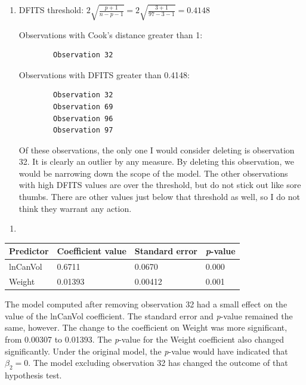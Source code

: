 \documentclass{article}
\providecommand{\tightlist}{%
      \setlength{\itemsep}{0pt}\setlength{\parskip}{0pt}}
\begin{document}
\begin{enumerate}
\def\labelenumi{\alph{enumi})}
\setcounter{enumi}{3}
\tightlist
\item
  DFITS threshold:
  \(2 \sqrt{\frac{p + 1}{n - p -1}} = 2 \sqrt{\frac{3 + 1}{97 - 3 - 1}} = 0.4148\)

Observations with Cook's distance greater than 1:

\begin{verbatim}
        Observation 32
\end{verbatim}

Observations with DFITS greater than 0.4148:

\begin{verbatim}
        Observation 32
        Observation 69
        Observation 96
        Observation 97
\end{verbatim}

Of these observations, the only one I would consider deleting is
observation 32. It is clearly an outlier by any measure. By deleting
this observation, we would be narrowing down the scope of the model. The
other observations with high DFITS values are over the threshold, but do
not stick out like sore thumbs. There are other values just below that
threshold as well, so I do not think they warrant any action.
\end{enumerate}

\begin{enumerate}
\def\labelenumi{\alph{enumi})}
\setcounter{enumi}{4}
\item
\end{enumerate}

\begin{longtable}[c]{@{}llll@{}}
\toprule
Predictor & Coefficient value & Standard error &
\emph{p}-value\tabularnewline
\midrule
\endhead
lnCanVol & 0.6711 & 0.0670 & 0.000\tabularnewline
Weight & 0.01393 & 0.00412 & 0.001\tabularnewline
\bottomrule
\end{longtable}

The model computed after removing observation 32 had a small effect on
the value of the lnCanVol coefficient. The standard error and
\emph{p}-value remained the same, however. The change to the coefficient
on Weight was more significant, from 0.00307 to 0.01393. The
\emph{p}-value for the Weight coefficient also changed significantly.
Under the original model, the \emph{p}-value would have indicated that
\(\beta_2 = 0\). The model excluding observation 32 has changed the
outcome of that hypothesis test.
\end{document}
